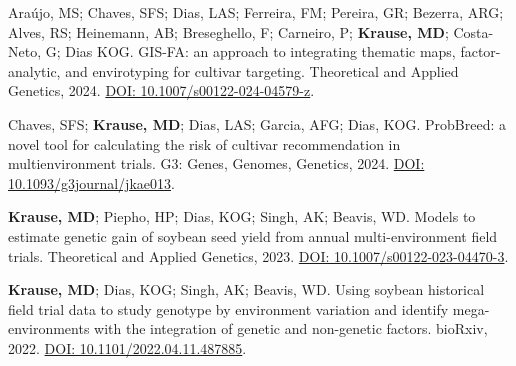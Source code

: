 \documentclass[]{mdkrause_cv_openfont}
\begin{document}
\begin{minipage}[t]{1\textwidth}
\sectionsep

\normalsize

Araújo, MS; Chaves, SFS; Dias, LAS; Ferreira, FM; Pereira, GR; Bezerra, ARG; Alves, RS; Heinemann, AB; Breseghello, F; Carneiro, P; \textbf{Krause, MD}; Costa-Neto, G; Dias KOG. GIS-FA: an approach to integrating thematic maps, factor-analytic, and envirotyping for cultivar targeting. Theoretical and Applied Genetics, 2024. \href{https://link.springer.com/article/10.1007/s00122-024-04579-z}{DOI: 10.1007/s00122-024-04579-z}. \ExternalLink 

\sectionsep

Chaves, SFS; \textbf{Krause, MD}; Dias, LAS; Garcia, AFG; Dias, KOG. ProbBreed: a novel tool for calculating the risk of cultivar recommendation in multienvironment trials. G3: Genes, Genomes, Genetics, 2024. \href{https://academic.oup.com/g3journal/article/14/3/jkae013/7577734}{DOI: 10.1093/g3journal/jkae013}. \ExternalLink 

\sectionsep

\textbf{Krause, MD}; Piepho, HP; Dias, KOG; Singh, AK; Beavis, WD. Models to estimate genetic gain of soybean seed yield from annual multi-environment field trials. Theoretical and Applied Genetics, 2023. \href{https://link.springer.com/article/10.1007/s00122-023-04470-3}{DOI: 10.1007/s00122-023-04470-3}. \ExternalLink 

\sectionsep

\textbf{Krause, MD}; Dias, KOG; Singh, AK; Beavis, WD. Using soybean historical field trial data to study genotype by environment variation and identify mega-environments with the integration of genetic and non-genetic factors. bioRxiv, 2022. \href{https://www.biorxiv.org/content/10.1101/2022.04.11.487885v6}{DOI: 10.1101/2022.04.11.487885}. \ExternalLink


\end{minipage} 
\hfill
\end{document}
